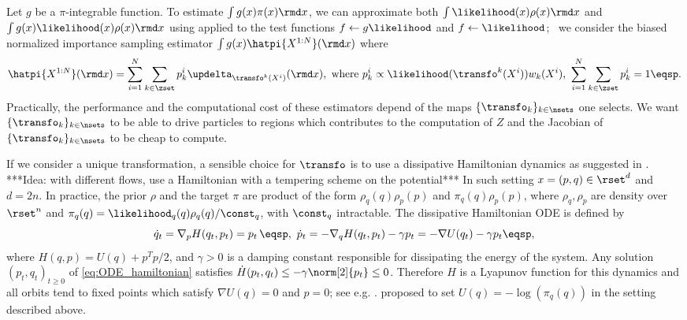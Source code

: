 Let $g$ be a $\pi$-integrable function. To estimate $\int g(x) \pi(x) \rmd x$, we can approximate both $\int \likelihood(x) \rho(x) \rmd x$ and  $\int g(x) \likelihood(x) \rho(x) \rmd x$  using  applied to the test functions $f \leftarrow g \likelihood$ and $f \leftarrow  \likelihood$; \ie~we consider the biased normalized importance sampling estimator $\int g(x) \hatpi{X^{1:N}}(\rmd x)$ where
\begin{equation}
  \label{eq:def_estimator_naive_monte_carlo}
  \hatpi{X^{1:N}}(\rmd x)= \sum_{i=1}^{N}
  \sum_{k\in \zset} p_k^i \updelta_{\transfo^k(X^i)}(\rmd x),~\text{where}~p_k^i\propto \likelihood(\transfo^{k}(X^i)) w_k(X^i),~\sum_{i=1}^{N}
  \sum_{k\in \zset} p_k^i=1 \eqsp.
\end{equation}
Practically, the performance and the computational cost of these
estimators depend of the maps $\{\transfo_k\}_{k\in\nsets}$ one selects. We want
$\{\transfo_k\}_{k\in\nsets}$ to be able to drive particles to regions which contributes to the computation of 
$Z$ and the Jacobian of $\{\transfo_k\}_{k\in\nsets}$ to be cheap to compute. 

If we consider a unique transformation, a sensible choice for $\transfo$ is to use a dissipative Hamiltonian dynamics as suggested in
\cite{rotskoff:vanden-eijden:2019}.
***Idea: with different flows, use a Hamiltonian with a tempering scheme on the potential*** In such setting
$x = (p,q) \in \rset^{d}$ and $d=2n$. In practice, the prior $\rho$
and the target $\pi$ are product of the form $\rho_q(q) \rho_p(p)$ and
$\pi_q(q) \rho_p(p)$, where $\rho_q,\rho_p$ are density over $\rset^n$
and $\pi_q(q) = \likelihood_q(q) \rho_q(q)/\const_q$, with $\const_q$ intractable. 
The dissipative Hamiltonian ODE is defined by %
\begin{equation}
  \label{eq:ODE_hamiltonian}
  \dot{q}_t=\nabla_{p} H(q_t,p_t) =  p_t \, \eqsp, \,\,
\dot{p}_t=-\nabla_{q} H(q_t,p_t)-\gamma p_t = -\nabla U(q_t) - \gamma
p_t \eqsp,\\
\end{equation}
where $H(q,p)=U(q)+ p^T p/2$, and $\gamma >0$ is a damping constant
responsible for dissipating the energy of the system.
Any solution $(p_t,q_t)_{t \geq 0}$ of \eqref{eq:ODE_hamiltonian} satisfies $\dot{H}(p_t,q_t) \leq - \gamma \norm[2]{p_t} \leq 0$. Therefore $H$ is a Lyapunov function for this dynamics and all orbits
tend to fixed points which satisfy $\nabla U(q)=0$ and $p=0$; see e.g. \cite[Proposition 2.2]{maddison2018hamiltonian}. \cite{rotskoff:vanden-eijden:2019} proposed to set $U(q) = -\log(\pi_q(q))$
in the setting described above.


